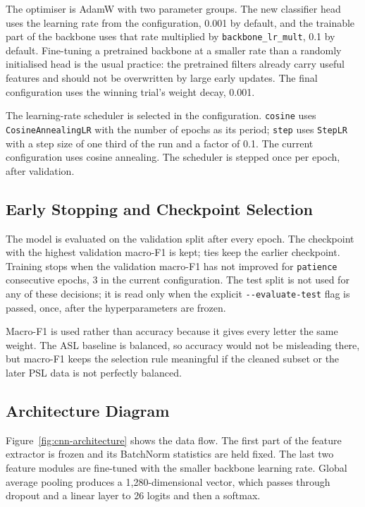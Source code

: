The optimiser is AdamW with two parameter groups. The new classifier head uses the learning rate from the configuration, 0.001 by default, and the trainable part of the backbone uses that rate multiplied by \texttt{backbone\_lr\_mult}, 0.1 by default. Fine-tuning a pretrained backbone at a smaller rate than a randomly initialised head is the usual practice: the pretrained filters already carry useful features and should not be overwritten by large early updates. The final configuration uses the winning trial's weight decay, 0.001.

The learning-rate scheduler is selected in the configuration. \texttt{cosine} uses \texttt{CosineAnnealingLR} with the number of epochs as its period; \texttt{step} uses \texttt{StepLR} with a step size of one third of the run and a factor of 0.1. The current configuration uses cosine annealing. The scheduler is stepped once per epoch, after validation.

\subsection{Early Stopping and Checkpoint Selection}

The model is evaluated on the validation split after every epoch. The checkpoint with the highest validation macro-F1 is kept; ties keep the earlier checkpoint. Training stops when the validation macro-F1 has not improved for \texttt{patience} consecutive epochs, 3 in the current configuration. The test split is not used for any of these decisions; it is read only when the explicit \texttt{-{}-evaluate-test} flag is passed, once, after the hyperparameters are frozen.

Macro-F1 is used rather than accuracy because it gives every letter the same weight. The ASL baseline is balanced, so accuracy would not be misleading there, but macro-F1 keeps the selection rule meaningful if the cleaned subset or the later PSL data is not perfectly balanced.

\subsection{Architecture Diagram}

Figure~\ref{fig:cnn-architecture} shows the data flow. The first part of the feature extractor is frozen and its BatchNorm statistics are held fixed. The last two feature modules are fine-tuned with the smaller backbone learning rate. Global average pooling produces a 1{,}280-dimensional vector, which passes through dropout and a linear layer to 26 logits and then a softmax.

